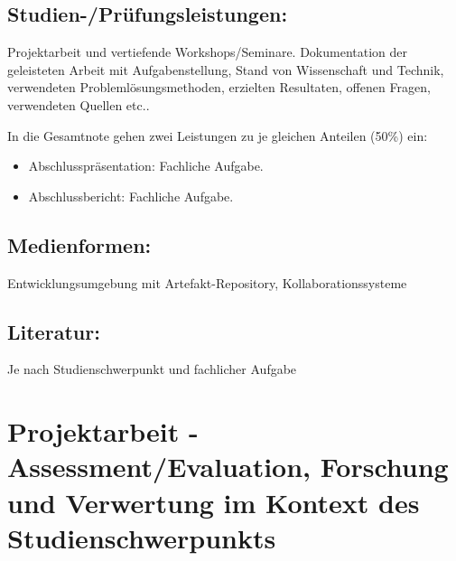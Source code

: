 \section*{Studien-/Prüfungsleistungen:}\label{studien-pruxfcfungsleistungen-8}

Projektarbeit und vertiefende Workshops/Seminare. Dokumentation der
geleisteten Arbeit mit Aufgabenstellung, Stand von Wissenschaft und
Technik, verwendeten Problemlösungsmethoden, erzielten Resultaten,
offenen Fragen, verwendeten Quellen etc..

In die Gesamtnote gehen zwei Leistungen zu je gleichen Anteilen (50\%)
ein:

\begin{itemize}
\tightlist
\item
  Abschlusspräsentation: Fachliche Aufgabe.
\item
  Abschlussbericht: Fachliche Aufgabe.
\end{itemize}

\section*{Medienformen:}\label{medienformen-8}

Entwicklungsumgebung mit Artefakt-Repository, Kollaborationssysteme

\section*{Literatur:}\label{literatur-8}

Je nach Studienschwerpunkt und fachlicher Aufgabe

\chapter{Projektarbeit - Assessment/Evaluation, Forschung und Verwertung
im Kontext des
Studienschwerpunkts}\label{projektarbeit---assessmentevaluation-forschung-und-verwertung-im-kontext-des-studienschwerpunkts}

